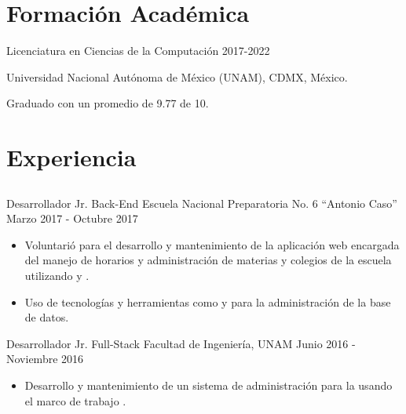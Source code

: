 \documentclass{resume}
\begin{document}
  \begin{paracol}{2}
    
    \section{Formación Académica}
      
      \datedsubsection%
        {Licenciatura en Ciencias de la Computación}
        {2017-2022}
        
        \noindent
        Universidad Nacional Autónoma de México (UNAM), CDMX, México.

        \vspace{0.5em}
        
        \noindent
        Graduado con un promedio de 9.77 de 10. 
        
        \noindent

    \section{Experiencia}
    
      \subsection{\large{}}

      \experience%
          {Desarrollador Jr. Back-End}
          {Escuela Nacional Preparatoria No. 6 ``Antonio Caso''}
          {Marzo 2017 - Octubre 2017}
          {
            \begin{itemize}
            \item 
              Voluntarió para el desarrollo y mantenimiento de la aplicación web
              encargada del manejo de horarios y administración de materias y
              colegios de la escuela utilizando  y .
              
            \item 
              Uso de tecnologías y herramientas como  y 
              para la administración de la base de datos.
            \end{itemize}
          }
        
      \experience%
          {Desarrollador Jr. Full-Stack}
          {Facultad de Ingeniería, UNAM}
          {Junio 2016 - Noviembre 2016}
          {
            \begin{itemize}
              \item
                Desarrollo y mantenimiento de un sistema de administración para
                la  usando el marco de trabajo .
                

\end{itemize}}
\end{paracol}
\end{document}
